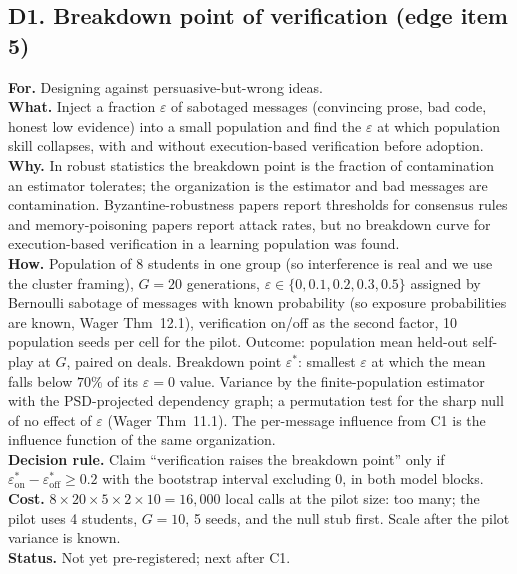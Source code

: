 \documentclass[11pt]{article}
\begin{document}
\subsection{D1. Breakdown point of verification (edge item 5)}
\textbf{For.} Designing against persuasive-but-wrong ideas.\\
\textbf{What.} Inject a fraction $\varepsilon$ of sabotaged messages (convincing prose, bad code, honest low
evidence) into a small population and find the $\varepsilon$ at which population skill collapses, with and without
execution-based verification before adoption.\\
\textbf{Why.} In robust statistics the breakdown point is the fraction of contamination an estimator tolerates; the
organization is the estimator and bad messages are contamination. Byzantine-robustness papers report thresholds for
consensus rules and memory-poisoning papers report attack rates, but no breakdown curve for execution-based
verification in a learning population was found.\\
\textbf{How.} Population of 8 students in one group (so interference is real and we use the cluster framing), $G=20$
generations, $\varepsilon\in\{0,0.1,0.2,0.3,0.5\}$ assigned by Bernoulli sabotage of messages with known
probability (so exposure probabilities are known, Wager Thm~12.1), verification on/off as the second factor, 10
population seeds per cell for the pilot. Outcome: population mean held-out self-play at $G$, paired on deals.
Breakdown point $\varepsilon^*$: smallest $\varepsilon$ at which the mean falls below $70\%$ of its $\varepsilon=0$
value. Variance by the finite-population estimator with the PSD-projected dependency graph; a permutation test for
the sharp null of no effect of $\varepsilon$ (Wager Thm~11.1). The per-message influence from C1 is the influence
function of the same organization.\\
\textbf{Decision rule.} Claim ``verification raises the breakdown point'' only if $\varepsilon^*_{\text{on}}-
\varepsilon^*_{\text{off}}\ge0.2$ with the bootstrap interval excluding 0, in both model blocks.\\
\textbf{Cost.} $8\times20\times5\times2\times10=16{,}000$ local calls at the pilot size: too many; the pilot uses
4 students, $G=10$, 5 seeds, and the null stub first. Scale after the pilot variance is known.\\
\textbf{Status.} Not yet pre-registered; next after C1.
\end{document}

